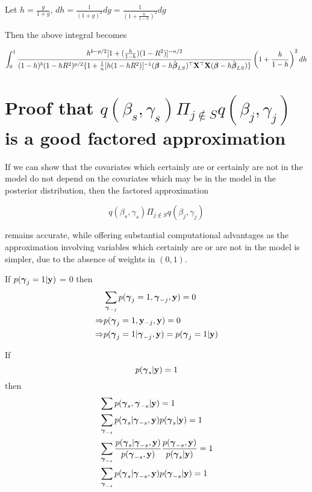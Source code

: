 \documentclass{amsart}[12pt]
\begin{document}
Let $h = \frac{g}{1 + g}$, $dh = \frac{1}{(1 + g)^2} dg = \frac{1}{\left(1 + \frac{h}{1 - h}\right)^2} dg$

Then the above integral becomes

\begin{align*}
	\int_0^1 \frac{h^{b - p/2} [1 + (\frac{h}{1 - h})(1 - R^2)]^{-n/2}}{(1 - h)^b (1 - h R^2)^{p/2} \{ 1 + \frac{1}{n}[h(1 - h R^2)]^{-1} ({\boldsymbol \beta} - h \hat{{\boldsymbol \beta}}_{LS})^\top {\bf X}^\top {\bf X} ({\boldsymbol \beta} - h \hat{{\boldsymbol \beta}}_{LS}) \}} \left(1 + \frac{h}{1 - h}\right)^2 dh 
\end{align*}

\section{Proof that $q(\beta_s, \gamma_s) \Pi_{j \notin S} q(\beta_j, \gamma_j)$ is a good factored approximation}

If we can show that the covariates which certainly are or certainly are not in the model do not depend on the
covariates which may be in the model in the posterior distribution, then the factored approximation

\[
	q(\beta_s, \gamma_s) \Pi_{j \notin S} q(\beta_j, \gamma_j)
\]

remains accurate, while offering substantial computational advantages as the approximation involving variables
which certainly are or are not in the model is simpler, due to the absence of weights in $(0, 1)$.

If $p({\boldsymbol \gamma}_j = 1|{\bf y})$ = 0
then
\begin{align*}
	            & \sum_{{\boldsymbol \gamma}_{-j}} p({\boldsymbol \gamma}_j=1, {\boldsymbol \gamma}_{-j}, {\bf y}) = 0 \\
	\Rightarrow & p({\boldsymbol \gamma}_j = 1, {\bf y}_{-j}, {\bf y}) = 0                       \\
	\Rightarrow & p({\boldsymbol \gamma}_j = 1| {\boldsymbol \gamma}_{-j}, {\bf y}) = p({\boldsymbol \gamma}_j=1|{\bf y})  \\
\end{align*}

If 
\begin{equation}\label{eq:star}
	p({\boldsymbol \gamma}_s|{\bf y}) = 1
\end{equation}
then
\begin{align*}
	  & \sum p({\boldsymbol \gamma}_s, {\boldsymbol \gamma}_{-s}|{\bf y}) = 1                                                                                            \\
	  & \sum_{{\boldsymbol \gamma}_{-s}} p({\boldsymbol \gamma}_s|{\boldsymbol \gamma}_{-s}, {\bf y}) p({\boldsymbol \gamma}_s|{\bf y}) = 1                                                            \\
	  & \sum_{{\boldsymbol \gamma}_{-s}} \frac{p({\boldsymbol \gamma}_s|{\boldsymbol \gamma}_{-s}, {\bf y})}{p({\boldsymbol \gamma}_{-s}, {\bf y})} \frac{p({\boldsymbol \gamma}_{-s}, {\bf y})}{ p({\boldsymbol \gamma}_s|{\bf y})} = 1 \\
	  & \sum_{{\boldsymbol \gamma}_{-s}} p({\boldsymbol \gamma}_s|{\boldsymbol \gamma}_{-s}, {\bf y}) p({\boldsymbol \gamma}_{-s}|{\bf y}) = 1                                                         \\
\end{align*}
\end{document}
